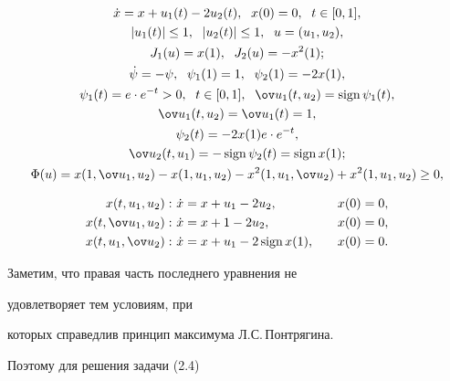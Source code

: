 \begin{exam}


\begin{gather*}


\Dot x=x+u_1(t)-2u_2(t),\ \; x(0)=0,\ \; t\in [0,1], \\


|u_1(t)|\leq 1,\ \; |u_2(t)|\leq 1,\ \; u=(u_1,u_2), \\


J_1(u)=x(1),\ \; J_2(u)=-x^{2}(1); \\


\Dot \psi=-\psi,\ \; \psi_1(1)=1,\ \;\psi_2(1)=-2x(1), \\


\psi_1(t)=e\cdot e^{-t}>0,\ \;t\in[0,1],\ \; \ov u_1(t,u_2)=\sign\psi_1(t),\\


\ov u_1(t,u_2)=\ov u_1(t)=1, \\


\psi_2(t)=-2x(1)e\cdot e^{-t}, \\


\ov u_2(t,u_1)=-\sign\psi_2(t)=\sign x(1); \\


\Phi(u)=x(1,\ov u_1,u_2)-x(1,u_1,u_2)-


x^2(1,u_1,\ov u_2)+x^2(1,u_1,u_2)\geq 0,


\end{gather*}


\vskip -8mm





\begin{alignat*}{2}


x(t,u_1,u_2):\ &\Dot x=x+u_1-2u_2, &\quad &x(0)=0,\\


x(t,\ov u_1,u_2):\ &\Dot x=x+1-2u_2, &\quad &x(0)=0,\\


x(t, u_1,\ov u_2):\ &\Dot x=x+u_1-2\sign x(1), &\quad &x(0)=0. 


\end{alignat*}





Заметим, что правая часть последнего уравнения не 


удовлетворяет тем условиям, при


которых справедлив принцип максимума Л.С.\,Понтрягина. 


Поэтому для решения задачи (2.4)



\end{exam}
